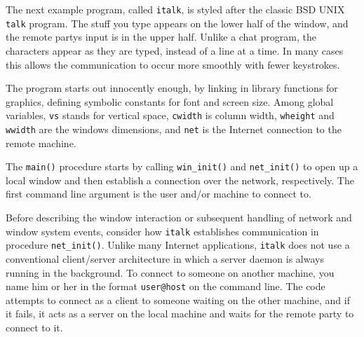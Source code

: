 The next example program, called \texttt{italk}, is styled after the
classic BSD UNIX \texttt{talk} program. The stuff you type
appears on the lower half of the window, and the remote
party{\textquotesingle}s input is in the upper half. Unlike a chat
program, the characters appear as they are typed, instead of a line at
a time. In many cases this allows the communication to occur more
smoothly with fewer keystrokes.

The program starts out innocently enough, by linking in library
functions for graphics, defining symbolic constants for font and screen
size. Among global variables, \texttt{vs} stands for vertical space,
\texttt{cwidth} is column width, \texttt{wheight} and \texttt{wwidth}
are the window{\textquotesingle}s dimensions, and \texttt{net} is the
Internet connection to the remote machine.


The \texttt{main()} procedure starts by calling \texttt{win\_init()} and
\texttt{net\_init()} to open up a local window and then establish a
connection over the network, respectively. The first command line
argument is the user and/or machine to connect to.


Before describing the window interaction or subsequent handling of
network and window system events, consider how \texttt{italk}
establishes communication in procedure \texttt{net\_init()}. Unlike
many Internet applications, \texttt{italk} does not use a conventional
client/server architecture in which a server daemon is always running
in the background. To connect to someone on another machine, you name
him or her in the format \texttt{user@host} on the command line. The
code attempts to connect as a client to someone waiting on the other
machine, and if it fails, it acts as a server on the local machine and
waits for the remote party to connect to it.

